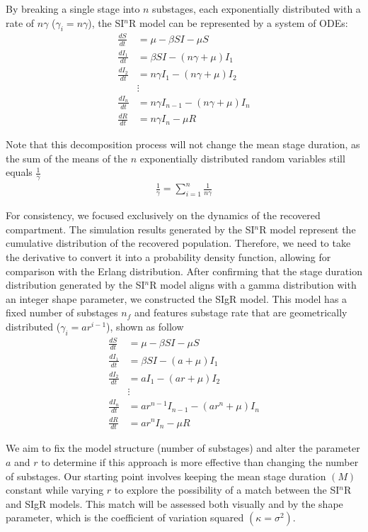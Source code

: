 \documentclass[12pt]{article}
\begin{document}
By breaking a single stage into $n$ substages, each exponentially distributed with a rate of $n\gamma$ ($\gamma_i = n\gamma$), the SI$^n$R model can be represented by a system of ODEs:
\begin{align*}
    \frac{dS}{dt} &= \mu - \beta SI - \mu S \\
    \frac{dI_1}{dt} &= \beta SI - (n \gamma + \mu) I_1 \\
    \frac{dI_2}{dt} &= n\gamma I_1 - (n \gamma + \mu) I_2 \\
    &\vdots \\
    \frac{dI_n}{dt} &= n\gamma I_{n-1} - (n \gamma + \mu) I_n \\
    \frac{dR}{dt} &= n \gamma I_n - \mu R
\end{align*}

Note that this decomposition process will not change the mean stage duration, as the sum of the means of the $n$ exponentially distributed random variables still equals $\frac{1}{\gamma}$
\begin{align*}
    \frac{1}{\gamma} = \sum_{i=1}^{n} \frac{1}{n\gamma}
\end{align*}

For consistency, we focused exclusively on the dynamics of the recovered compartment. The simulation results generated by the SI$^n$R model represent the cumulative distribution of the recovered population. Therefore, we need to take the derivative to convert it into a probability density function, allowing for comparison with the Erlang distribution. After confirming that the stage duration distribution generated by the SI$^n$R model aligns with a gamma distribution with an integer shape parameter, we constructed the SIgR model. This model has a fixed number of substages $n_f$ and features substage rate that are geometrically distributed ($\gamma_i = ar^{i-1}$), shown as follow
\begin{align*}
    \frac{dS}{dt} &= \mu - \beta SI - \mu S \\
    \frac{dI_1}{dt} &= \beta SI - (a + \mu) I_1 \\
    \frac{dI_2}{dt} &= a I_1 - (ar + \mu) I_2 \\
    &\vdots \\
    \frac{dI_n}{dt} &= ar^{n-1} I_{n-1} - (ar^n + \mu) I_n \\
    \frac{dR}{dt} &= ar^n I_n - \mu R
\end{align*}

We aim to fix the model structure (number of substages) and alter the parameter $a$ and $r$ to determine if this approach is more effective than changing the number of substages. Our starting point involves keeping the mean stage duration $(M)$ constant while varying $r$ to explore the possibility of a match between the SI$^n$R and SIgR models. This match will be assessed both visually and by the shape parameter, which is the coefficient of variation squared $(\kappa = \sigma^2)$.
\end{document}
